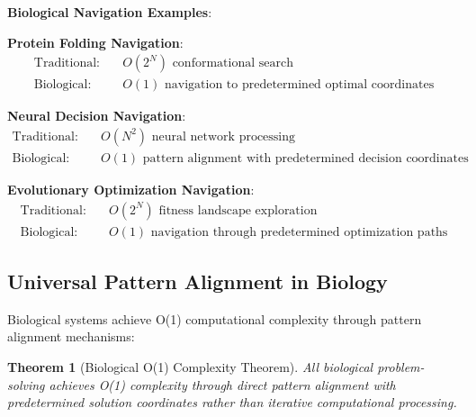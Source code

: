\documentclass[12pt,a4paper]{article}
\newtheorem{theorem}{Theorem}[section]
\begin{document}
\textbf{Biological Navigation Examples}:

\textbf{Protein Folding Navigation}:
\begin{align}
\text{Traditional}: \quad &O(2^N) \text{ conformational search} \\
\text{Biological}: \quad &O(1) \text{ navigation to predetermined optimal coordinates}
\end{align}

\textbf{Neural Decision Navigation}:
\begin{align}
\text{Traditional}: \quad &O(N^2) \text{ neural network processing} \\
\text{Biological}: \quad &O(1) \text{ pattern alignment with predetermined decision coordinates}
\end{align}

\textbf{Evolutionary Optimization Navigation}:
\begin{align}
\text{Traditional}: \quad &O(2^N) \text{ fitness landscape exploration} \\
\text{Biological}: \quad &O(1) \text{ navigation through predetermined optimization paths}
\end{align}

\subsection{Universal Pattern Alignment in Biology}

Biological systems achieve O(1) computational complexity through pattern alignment mechanisms:

\begin{theorem}[Biological O(1) Complexity Theorem]
All biological problem-solving achieves O(1) complexity through direct pattern alignment with predetermined solution coordinates rather than iterative computational processing.
\end{theorem}
\end{document}
